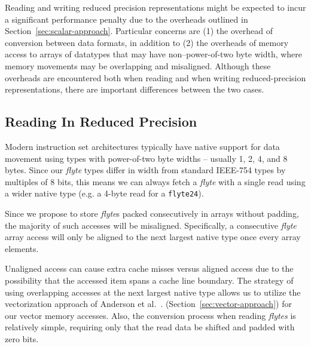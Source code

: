 \documentclass{sig-alternate-05-2015}
\newcommand{\mt}[1]{\texttt{#1}}
\begin{document}
Reading and writing reduced precision representations might be expected to
incur a significant performance penalty due to the overheads outlined in
Section~\ref{sec:scalar-approach}. Particular concerns are (1) the overhead of
conversion between data formats, in addition to (2) the overheads of memory
access to arrays of datatypes that may have non--power-of-two byte width, where
memory movements may be overlapping and misaligned. Although these overheads
are encountered both when reading and when writing reduced-precision
representations, there are important differences between the two cases.

\subsection{Reading In Reduced Precision}
\label{sec:reads}

Modern instruction set architectures typically have native support for data
movement using types with power-of-two byte widths -- usually 1, 2, 4, and 8
bytes. Since our \textit{flyte} types differ in width from standard IEEE-754
types by multiples of 8 bits, this means we can always fetch a \textit{flyte}
with a single read using a wider native type (e.g. a 4-byte read for a
\mt{flyte24}).


Since we propose to store \textit{flyte}s packed
consecutively in arrays without padding, the majority of such accesses will be
misaligned. Specifically, a consecutive \textit{flyte} array access will only
be aligned to the next largest native type once every  array
elements.

Unaligned access can cause extra cache misses versus aligned access due to the
possibility that the accessed item spans a cache line boundary. The strategy of
using overlapping accesses at the next largest native type allows us to utilize
the vectorization approach of Anderson et al.~\cite{anderson2015automatic}.
(Section~\ref{sec:vector-approach}) for our vector memory accesses. Also, the
conversion process when reading \textit{flytes} is relatively simple, requiring
only that the read data be shifted and padded with zero bits.
\end{document}

